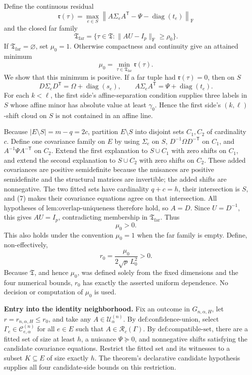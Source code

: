 Define the continuous residual
\[
\mathfrak r(\tau)=
\max_{e\in S}
\left\|A\Sigma_eA^{\mathsf T}
-\Psi-\operatorname{diag}(t_e)\right\|_{\mathrm F}
\]
and the closed far family
\[
\mathfrak T_{\mathrm{far}}
=\{\tau\in\mathfrak T:\|AU-I_p\|_{\mathrm F}\geq\rho_0\}.
\]
If \(\mathfrak T_{\mathrm{far}}=\varnothing\), set \(\mu_0=1\). Otherwise compactness and continuity give an attained minimum
\[
\mu_0=\min_{\tau\in\mathfrak T_{\mathrm{far}}}\mathfrak r(\tau).
\tag{6}
\]
We show that this minimum is positive. If a far tuple had \(\mathfrak r(\tau)=0\), then on \(S\)
\[
D\Sigma_eD^{\mathsf T}=\Omega+\operatorname{diag}(s_e),
\qquad
A\Sigma_eA^{\mathsf T}=\Psi+\operatorname{diag}(t_e).
\tag{7}
\]
For each \(k<\ell\), the first side's affine-separation condition supplies three labels in \(S\) whose affine minor has absolute value at least \(\gamma_0\). Hence the first side's \((k,\ell)\)-shift cloud on \(S\) is not contained in an affine line.

Because \(|E\setminus S|=m-q=2c\), partition \(E\setminus S\) into disjoint sets \(C_1,C_2\) of cardinality \(c\). Define one covariance family on \(E\) by using \(\Sigma_e\) on \(S\), \(D^{-1}\Omega D^{-\mathsf T}\) on \(C_1\), and \(A^{-1}\Psi A^{-\mathsf T}\) on \(C_2\). Extend the first explanation to \(S\cup C_1\) with zero shifts on \(C_1\), and extend the second explanation to \(S\cup C_2\) with zero shifts on \(C_2\). These added covariances are positive semidefinite because the nuisances are positive semidefinite and the structural matrices are invertible; the added shifts are nonnegative. The two fitted sets have cardinality \(q+c=h\), their intersection is \(S\), and (7) makes their covariance equations agree on that intersection. All hypotheses of \(\text{lem:overlap-uniqueness}\) therefore hold, so \(A=D\). Since \(U=D^{-1}\), this gives \(AU=I_p\), contradicting membership in \(\mathfrak T_{\mathrm{far}}\). Thus
\[
\mu_0>0.
\tag{8}
\]
This also holds under the convention \(\mu_0=1\) when the far family is empty. Define, non-effectively,
\[
r_0=\frac{\mu_0}{2\sqrt p\,L_0^2}>0.
\tag{9}
\]
Because \(\mathfrak T\), and hence \(\mu_0\), was defined solely from the fixed dimensions and the four numerical bounds, \(r_0\) has exactly the asserted uniform dependence. No decision or computation of \(\mu_0\) is used.

\textbf{Entry into the identity neighborhood.}
Fix an outcome in \(G_{n,\alpha,H}\), let \(r=r_{n,\alpha,H}\leq r_0\), and take any \(A\in\mathcal U^{(n)}_\alpha\). By \(\text{def:confidence-union}\), select \(\Gamma_e\in\mathcal C^{(n)}_{e,\alpha}\) for all \(e\in E\) such that \(A\in\mathcal R_c(\Gamma)\). By \(\text{def:compatible-set}\), there are a fitted set of size at least \(h\), a nuisance \(\Psi\succeq0\), and nonnegative shifts satisfying the candidate covariance equations. Restrict the fitted set and its witnesses to a subset \(K\subseteq E\) of size exactly \(h\). The theorem's declarative candidate hypothesis supplies all four candidate-side bounds on this restriction.

